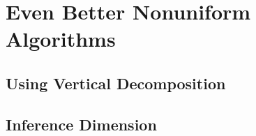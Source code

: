 \section{Even Better Nonuniform Algorithms}

\subsection{Using Vertical Decomposition}

\subsection{Inference Dimension}
